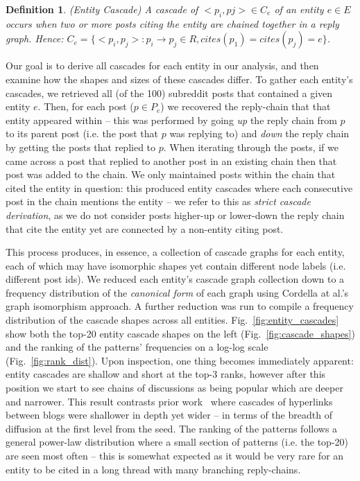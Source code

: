 \documentclass[sigconf,anonymous,review]{acmart}
\newtheorem{mydef}{Definition}
\begin{document}
\begin{mydef}
(Entity Cascade) A cascade of ${<p_i, pj>} \in C_e$ of an entity $e \in E$ occurs when two or more posts citing the entity are chained together in a reply graph. 
Hence: $C_e = \{<p_i, p_j> : p_i \rightarrow p_j \in R, cites(p_1) = cites(p_j) = e\}$.
\end{mydef}

Our goal is to derive all cascades for each entity in our analysis, and then examine how the shapes and sizes of these cascades differ.
To gather each entity's cascades, we retrieved all (of the 100) subreddit posts that contained a given entity $e$.
Then, for each post ($p \in P_e$) we recovered the reply-chain that that entity appeared within -- this was performed by going \emph{up} the reply chain from $p$ to its parent post (i.e. the post that $p$ was replying to) and \emph{down} the reply chain by getting the posts that replied to $p$.
When iterating through the posts, if we came across a post that replied to another post in an existing chain then that post was added to the chain.
We only maintained posts within the chain that cited the entity in question: this produced entity cascades where each consecutive post in the chain mentions the entity -- we refer to this as \emph{strict cascade derivation}, as we do not consider posts higher-up or lower-down the reply chain that cite the entity yet are connected by a non-entity citing post. %

This process produces, in essence, a collection of cascade graphs for each entity, each of which may have isomorphic shapes yet contain different node labels (i.e. different post ids).
We reduced each entity's cascade graph collection down to a frequency distribution of the \emph{canonical form} of each graph using Cordella at al.'s~\cite{cordella2001improved} graph isomorphism approach.
A further reduction was run to compile a frequency distribution of the cascade shapes across all entities.
Fig.~\ref{fig:entity_cascades} show both the top-20 entity cascade shapes on the left (Fig.~\ref{fig:cascade_shapes}) and the ranking of the patterns' frequencies on a log-log scale (Fig.~\ref{fig:rank_dist}).
Upon inspection, one thing becomes immediately apparent: entity cascades are shallow and short at the top-3 ranks, however after this position we start to see chains of discussions as being popular which are deeper and narrower.
This result contrasts prior work~\cite{leskovec2007patterns} where cascades of hyperlinks between blogs were shallower in depth yet wider -- in terms of the breadth of diffusion at the first level from the seed. 
The ranking of the patterns follows a general power-law distribution where a small section of patterns (i.e. the top-20) are seen most often -- this is somewhat expected as it would be very rare for an entity to be cited in a long thread with many branching reply-chains.
\end{document}
